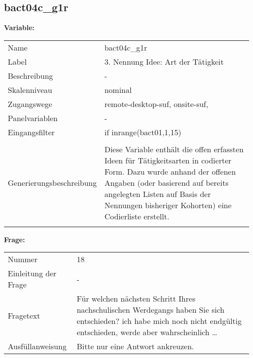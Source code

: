 	
	
	\subsection{bact04c\_g1r}
	\label{subSection:bact04c_g1r}

	\noindent\textbf{Variable:}\\
		\begin{tabular}{lL{11.3cm}}
			\label{tableVariable:bact04c_g1r}
			Name & bact04c\_g1r \\
			Label & 3. Nennung Idee: Art der Tätigkeit \\
			Beschreibung & - \\
			Skalenniveau & nominal \\
			Zugangswege &
				remote-desktop-suf,
				onsite-suf,
 \\
			Panelvariablen & -
			 \\
			Eingangsfilter & if inrange(bact01,1,15) \\
 \\
					Generierungsbeschreibung & Diese Variable enthält die offen erfassten Ideen für Tätigkeitsarten in codierter Form. Dazu wurde anhand der offenen Angaben (oder basierend auf bereits angelegten Listen auf Basis der Nennungen bisheriger Kohorten) eine Codierliste erstellt.
				 \\	
			 \\
		\end{tabular}

		\vspace*{1 cm}
		\noindent\textbf{Frage:}\\
		\begin{tabular}{lL{11.3cm}}
			\label{tableQuestion:bact04c_g1r}
			Nummer & 18 \\
			Einleitung der Frage & - \\
			Fragetext & Für welchen nächsten Schritt Ihres nachschulischen Werdegangs haben Sie sich entschieden?
ich habe mich noch nicht endgültig entschieden, werde aber wahrscheinlich … \\
			Ausfüllanweisung & Bitte nur eine Antwort ankreuzen. \\
		\end{tabular}





